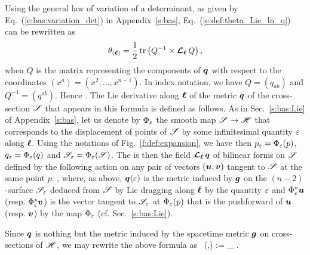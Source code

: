 Using the general law of variation of a determinant, as given by Eq.~(\ref{e:bas:variation_det})
in Appendix~\ref{s:bas}, Eq.~(\ref{e:def:theta_Lie_ln_q}) can be rewritten as
\[
    \theta_{(\bm{\ell})} = \frac{1}{2} \, \mathrm{tr} \left(Q^{-1} \times \bm{\mathcal{L}}_{\bm{\ell}}\, Q \right) ,
\]
when $Q$ is the matrix representing the components of $\bm{q}$ with respect to the
coordinates $(x^a) = (x^2,\ldots, x^{n-1})$. In index notation, we have
$Q = (q_{ab})$ and $Q^{-1} = (q^{ab})$. Hence
\be \label{e:def:theta_q_ab}
     .
\ee
The Lie derivative along $\bm{\ell}$ of the metric $\bm{q}$ of the cross-section
$\mathscr{S}$ that appears in this formula is defined as follows. As in Sec.~\ref{s:bas:Lie}
of Appendix~\ref{s:bas}, let us denote by $\Phi_\varepsilon$ the smooth map
$\mathscr{S} \to \mathscr{H}$ that corresponds to the displacement of points of $\mathscr{S}$ by
some infinitesimal quantity $\varepsilon$ along $\bm{\ell}$. Using the notations
of Fig.~\ref{f:def:expansion}, we have then $p_\varepsilon = \Phi_\varepsilon(p)$,
$q_\varepsilon = \Phi_\varepsilon(q)$ and $\mathscr{S}_\varepsilon = \Phi_\varepsilon(\mathscr{S})$. The  is then the field $\bm{\mathcal{L}}_{\bm{\ell}}\, \bm{q}$
of bilinear forms on $\mathscr{S}$ defined by the following action on any pair of vectors $(\bm{u},\bm{v})$
tangent to $\mathscr{S}$ at the same point $p$:
\be \label{e:def:def_Lie_ell_q}
   ,
\ee
where, as above, $\bm{q}(\varepsilon)$ is the metric induced by $\bm{g}$ on the $(n-2)$-surface
$\mathscr{S}_\varepsilon$ deduced from $\mathscr{S}$ by Lie dragging along $\bm{\ell}$ by the quantity $\varepsilon$
and
$\Phi_\varepsilon^* \bm{u}$ (resp. $\Phi_\varepsilon^* \bm{v}$) is the vector tangent to $\mathscr{S}_\varepsilon$
at $\Phi_\varepsilon(p)$ that is the pushforward of $\bm{u}$ (resp. $\bm{v}$) by the map $\Phi_\varepsilon$
(cf. Sec.~\ref{s:bas:Lie}).

\begin{remark}
Since $\bm{q}$ is nothing but the metric induced by the spacetime metric $\bm{g}$
on cross-sections of $\mathscr{H}$, we may rewrite the above formula as
\be
     \Lie{\el} \, (,) := \lim_{\veps{}} 
     .
\ee
\end{remark}

